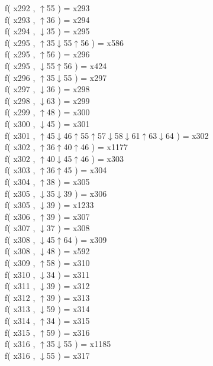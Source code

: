 f( x292 , $\uparrow$55 ) = x293 \\
f( x293 , $\uparrow$36 ) = x294 \\
f( x294 , $\downarrow$35 ) = x295 \\
f( x295 , $\uparrow$35$\downarrow$55$\uparrow$56 ) = x586 \\
f( x295 , $\uparrow$56 ) = x296 \\
f( x295 , $\downarrow$55$\uparrow$56 ) = x424 \\
f( x296 , $\uparrow$35$\downarrow$55 ) = x297 \\
f( x297 , $\downarrow$36 ) = x298 \\
f( x298 , $\downarrow$63 ) = x299 \\
f( x299 , $\uparrow$48 ) = x300 \\
f( x300 , $\downarrow$45 ) = x301 \\
f( x301 , $\uparrow$45$\downarrow$46$\uparrow$55$\uparrow$57$\downarrow$58$\downarrow$61$\uparrow$63$\downarrow$64 ) = x302 \\
f( x302 , $\uparrow$36$\uparrow$40$\uparrow$46 ) = x1177 \\
f( x302 , $\uparrow$40$\downarrow$45$\uparrow$46 ) = x303 \\
f( x303 , $\uparrow$36$\uparrow$45 ) = x304 \\
f( x304 , $\uparrow$38 ) = x305 \\
f( x305 , $\downarrow$35$\downarrow$39 ) = x306 \\
f( x305 , $\downarrow$39 ) = x1233 \\
f( x306 , $\uparrow$39 ) = x307 \\
f( x307 , $\downarrow$37 ) = x308 \\
f( x308 , $\downarrow$45$\uparrow$64 ) = x309 \\
f( x308 , $\downarrow$48 ) = x592 \\
f( x309 , $\uparrow$58 ) = x310 \\
f( x310 , $\downarrow$34 ) = x311 \\
f( x311 , $\downarrow$39 ) = x312 \\
f( x312 , $\uparrow$39 ) = x313 \\
f( x313 , $\downarrow$59 ) = x314 \\
f( x314 , $\uparrow$34 ) = x315 \\
f( x315 , $\uparrow$59 ) = x316 \\
f( x316 , $\uparrow$35$\downarrow$55 ) = x1185 \\
f( x316 , $\downarrow$55 ) = x317 \\
